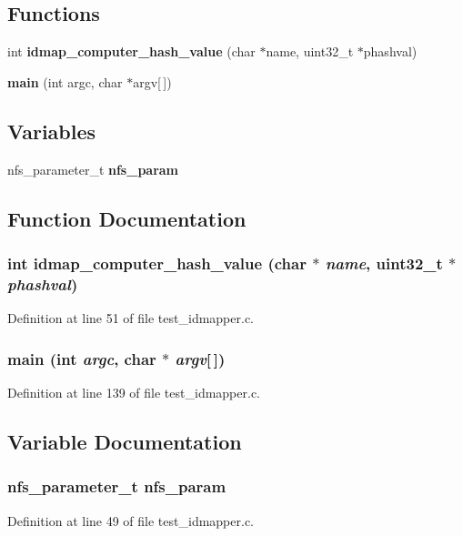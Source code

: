 \subsection*{Functions}
\begin{DoxyCompactItemize}
\item 
int {\bf idmap\_\-computer\_\-hash\_\-value} (char $\ast$name, uint32\_\-t $\ast$phashval)
\item 
{\bf main} (int argc, char $\ast$argv[$\,$])
\end{DoxyCompactItemize}
\subsection*{Variables}
\begin{DoxyCompactItemize}
\item 
nfs\_\-parameter\_\-t {\bf nfs\_\-param}
\end{DoxyCompactItemize}


\subsection{Function Documentation}
\subsubsection[{idmap\_\-computer\_\-hash\_\-value}]{\setlength{\rightskip}{0pt plus 5cm}int idmap\_\-computer\_\-hash\_\-value (char $\ast$ {\em name}, \/  uint32\_\-t $\ast$ {\em phashval})}\label{test__idmapper_8c_a4c0888a6963b400f9ec8dbe4ee162918}


Definition at line 51 of file test\_\-idmapper.c.
\subsubsection[{main}]{\setlength{\rightskip}{0pt plus 5cm}main (int {\em argc}, \/  char $\ast$ {\em argv}[$\,$])}\label{test__idmapper_8c_ae0665038b72011f5c680c660fcb59459}


Definition at line 139 of file test\_\-idmapper.c.

\subsection{Variable Documentation}
\subsubsection[{nfs\_\-param}]{\setlength{\rightskip}{0pt plus 5cm}nfs\_\-parameter\_\-t {\bf nfs\_\-param}}\label{test__idmapper_8c_aeb8fc46586993cf210777049fca03969}


Definition at line 49 of file test\_\-idmapper.c.